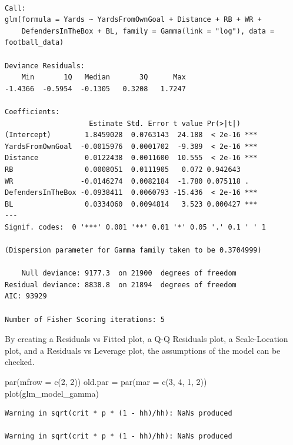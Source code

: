 \documentclass[
  super,
  preprint,
  3p]{elsarticle}
\newenvironment{Shaded}{\begin{snugshade}}{\end{snugshade}}
\newcommand{\AttributeTok}[1]{\textcolor[rgb]{0.40,0.45,0.13}{#1}}
\newcommand{\DecValTok}[1]{\textcolor[rgb]{0.68,0.00,0.00}{#1}}
\newcommand{\FunctionTok}[1]{\textcolor[rgb]{0.28,0.35,0.67}{#1}}
\newcommand{\NormalTok}[1]{\textcolor[rgb]{0.00,0.23,0.31}{#1}}
\newcommand{\OtherTok}[1]{\textcolor[rgb]{0.00,0.23,0.31}{#1}}
\begin{document}
\begin{verbatim}

Call:
glm(formula = Yards ~ YardsFromOwnGoal + Distance + RB + WR + 
    DefendersInTheBox + BL, family = Gamma(link = "log"), data = football_data)

Deviance Residuals: 
    Min       1Q   Median       3Q      Max  
-1.4366  -0.5954  -0.1305   0.3208   1.7247  

Coefficients:
                    Estimate Std. Error t value Pr(>|t|)    
(Intercept)        1.8459028  0.0763143  24.188  < 2e-16 ***
YardsFromOwnGoal  -0.0015976  0.0001702  -9.389  < 2e-16 ***
Distance           0.0122438  0.0011600  10.555  < 2e-16 ***
RB                 0.0008051  0.0111905   0.072 0.942643    
WR                -0.0146274  0.0082184  -1.780 0.075118 .  
DefendersInTheBox -0.0938411  0.0060793 -15.436  < 2e-16 ***
BL                 0.0334060  0.0094814   3.523 0.000427 ***
---
Signif. codes:  0 '***' 0.001 '**' 0.01 '*' 0.05 '.' 0.1 ' ' 1

(Dispersion parameter for Gamma family taken to be 0.3704999)

    Null deviance: 9177.3  on 21900  degrees of freedom
Residual deviance: 8838.8  on 21894  degrees of freedom
AIC: 93929

Number of Fisher Scoring iterations: 5
\end{verbatim}

By creating a Residuals vs Fitted plot, a Q-Q Residuals plot, a
Scale-Location plot, and a Residuals vs Leverage plot, the assumptions
of the model can be checked.

\begin{Shaded}
\begin{Highlighting}[]
\FunctionTok{par}\NormalTok{(}\AttributeTok{mfrow =} \FunctionTok{c}\NormalTok{(}\DecValTok{2}\NormalTok{, }\DecValTok{2}\NormalTok{))}
\NormalTok{old.par }\OtherTok{=} \FunctionTok{par}\NormalTok{(}\AttributeTok{mar =} \FunctionTok{c}\NormalTok{(}\DecValTok{3}\NormalTok{, }\DecValTok{4}\NormalTok{, }\DecValTok{1}\NormalTok{, }\DecValTok{2}\NormalTok{))}
\FunctionTok{plot}\NormalTok{(glm\_model\_gamma)}
\end{Highlighting}
\end{Shaded}

\begin{verbatim}
Warning in sqrt(crit * p * (1 - hh)/hh): NaNs produced

Warning in sqrt(crit * p * (1 - hh)/hh): NaNs produced
\end{verbatim}
\end{document}
